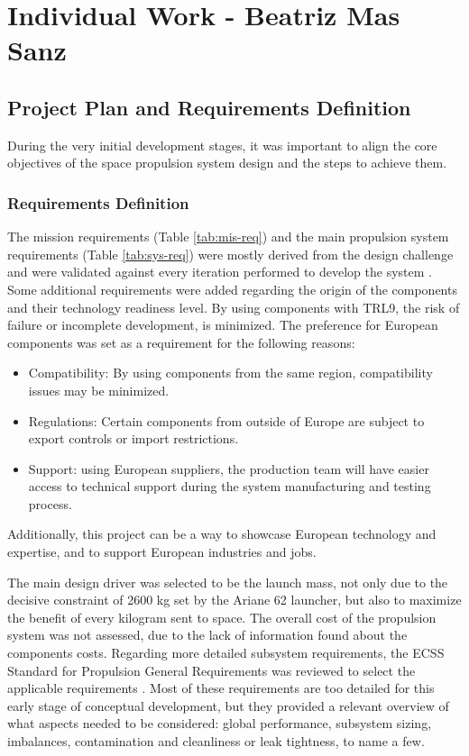 \section{Individual Work - Beatriz Mas Sanz}

\subsection{Project Plan and Requirements Definition}
During the very initial development stages, it was important to align the core objectives of the space propulsion system design and the steps to achieve them.
\subsubsection{Requirements Definition}
The mission requirements (Table \ref{tab:mis-req}) and the main propulsion system requirements (Table \ref{tab:sys-req}) were mostly derived from the design challenge and were validated against every iteration performed to develop the system \cite{Manfletti.2022}. Some additional requirements were added regarding the origin of the components and their technology readiness level. By using components with TRL9, the risk of failure or incomplete development, is minimized. The preference for European components was set as a requirement for the following reasons: 
\begin{itemize}
    \item Compatibility: By using components from the same region, compatibility issues may be minimized.
    \item Regulations: Certain components from outside of Europe are subject to export controls or import restrictions.
    \item Support: using European suppliers, the production team will have easier access to technical support during the system manufacturing and testing process.
\end{itemize}
Additionally, this project can be a way to showcase European technology and expertise, and to support European industries and jobs.

The main design driver was selected to be the launch mass, not only due to the decisive constraint of 2600 kg set by the Ariane 62 launcher, but also to maximize the benefit of every kilogram sent to space. The overall cost of the propulsion system was not assessed, due to the lack of information found about the components costs. 
Regarding more detailed subsystem requirements, the ECSS Standard for Propulsion General Requirements was reviewed to select the applicable requirements \cite{ECSSEST385:online}. Most of these requirements are too detailed for this early stage of conceptual development, but they provided a relevant overview of what aspects needed to be considered: global performance, subsystem sizing, imbalances, contamination and cleanliness or leak tightness, to name a few.


